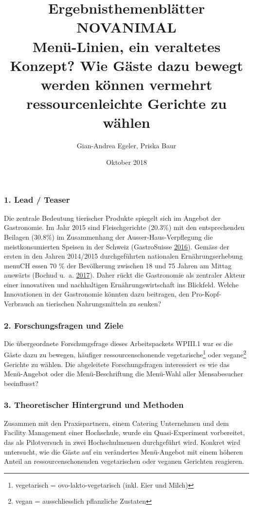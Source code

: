\documentclass[12pt,ngerman,]{article}
\title{Ergebnisthemenblätter NOVANIMAL\\
Menü-Linien, ein veraltetes Konzept? Wie Gäste dazu bewegt werden können
vermehrt ressourcenleichte Gerichte zu wählen}
\author{Gian-Andrea Egeler, Priska Baur}
\date{Oktober 2018}
\let\rmarkdownfootnote\footnote%
\def\footnote{\protect\rmarkdownfootnote}
\begin{document}
\maketitle

\hypertarget{lead-teaser}{%
\subsubsection{1. Lead / Teaser}\label{lead-teaser}}

Die zentrale Bedeutung tierischer Produkte spiegelt sich im Angebot der
Gastronomie. Im Jahr 2015 sind Fleischgerichte (20.3\%) mit den
entsprechenden Beilagen (30.8\%) im Zusammenhang der
Ausser-Haus-Verpflegung die meistkonsumierten Speisen in der Schweiz
(GastroSuisse
\protect\hyperlink{ref-gastrosuisse_branchenspiegel_2016}{2016}). Gemäss
der ersten in den Jahren 2014/2015 durchgeführten nationalen
Ernährungserhebung menuCH essen 70 \% der Bevölkerung zwischen 18 und 75
Jahren am Mittag auswärts (Bochud u.~a.
\protect\hyperlink{ref-bochud_anthropometric_2017}{2017}). Daher rückt
die Gastronomie als zentraler Akteur einer innovativen und nachhaltigen
Ernährungswirtschaft ins Blickfeld. Welche Innovationen in der
Gastronomie könnten dazu beitragen, den Pro-Kopf-Verbrauch an tierischen
Nahrungsmitteln zu senken?

\hypertarget{forschungsfragen-und-ziele}{%
\subsubsection{2. Forschungsfragen und
Ziele}\label{forschungsfragen-und-ziele}}

Die übergeordnete Forschungsfrage dieses Arbeitspackets WPIII.1 war es
die Gäste dazu zu bewegen, häufiger ressourcenschonende
vegetarische\footnote{vegetarisch = ovo-lakto-vegetarisch (inkl. Eier
  und Milch)} oder vegane\footnote{vegan = ausschliesslich pflanzliche
  Zustaten} Gerichte zu wählen. Die abgeleitete Forschungsfragen
interessiert es wie das Menü-Angebot oder die Menü-Beschriftung die
Menü-Wahl aller Mensabesucher beeinflusst?

\newpage

\hypertarget{theoretischer-hintergrund-und-methoden}{%
\subsubsection{3. Theoretischer Hintergrund und
Methoden}\label{theoretischer-hintergrund-und-methoden}}

Zusammen mit den Praxispartnern, einem Catering Unternehmen und dem
Facility Management einer Hochschule, wurde ein Quasi-Experiment
vorbereitet, das als Pilotversuch in zwei Hochschulmensen durchgeführt
wird. Konkret wird untersucht, wie die Gäste auf ein verändertes
Menü-Angebot mit einem höheren Anteil an ressourcenschonenden
vegetarischen oder veganen Gerichten reagieren.
\end{document}
